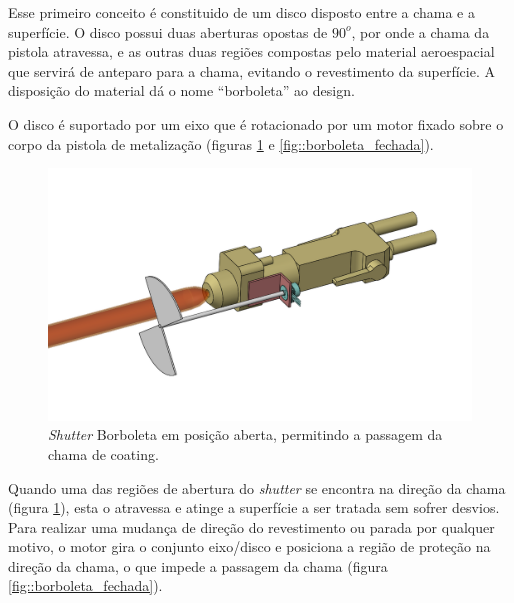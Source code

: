 Esse primeiro conceito é constituido de um disco disposto entre a chama e a
superfície. O disco possui duas aberturas opostas de $90^o$, por onde a chama da
pistola atravessa, e as outras duas regiões compostas pelo material
aeroespacial que servirá de anteparo para a chama, evitando o
revestimento da superfície. A disposição do material dá o nome
``borboleta'' ao design.

O disco é suportado por um eixo que é rotacionado por um motor fixado sobre o
corpo da pistola de metalização (figuras \ref{fig::borboleta_aberta} e
\ref{fig::borboleta_fechada}).

\begin{figure}[h!]
\centering
	\includegraphics[width=\columnwidth]{figs/estudo/shutter/Shutter_Borboleta_Aberto}
	\caption{\textit{Shutter} Borboleta em posição aberta, permitindo a passagem da chama
	de coating.}
	\label{fig::borboleta_aberta}
\end{figure}

Quando uma das regiões de abertura do \textit{shutter} se encontra na direção da
chama (figura \ref{fig::borboleta_aberta}), esta o atravessa e atinge a
superfície a ser tratada sem sofrer desvios. Para realizar uma mudança de
direção do revestimento ou parada por qualquer motivo, o motor gira o conjunto
eixo/disco e posiciona a região de proteção na direção da chama, o que impede a passagem da
chama (figura \ref{fig::borboleta_fechada}).

